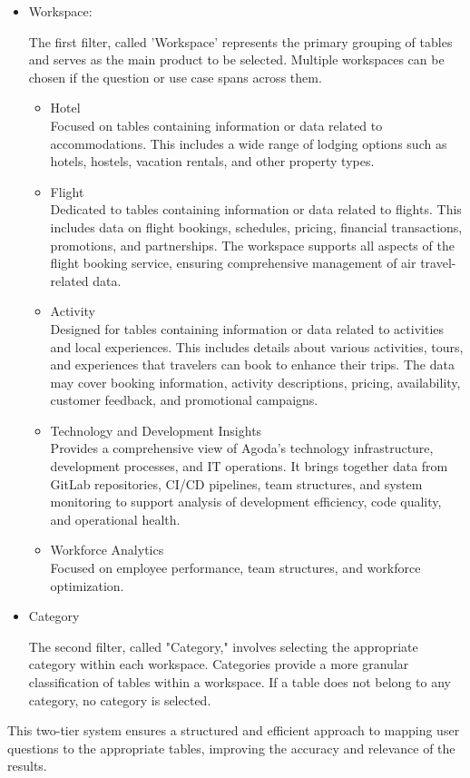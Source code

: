     \begin{itemize}
        \item Workspace:

        The first filter, called 'Workspace' represents the primary grouping of tables and serves as the main product to be selected. Multiple workspaces can be chosen if the question or use case spans across them.
            \begin{itemize}
                \item Hotel \\
                Focused on tables containing information or data related to accommodations. This includes a wide range of lodging options such as hotels, hostels, vacation rentals, and other property types.
                \item Flight \\
                Dedicated to tables containing information or data related to flights. This includes data on flight bookings, schedules, pricing, financial transactions, promotions, and partnerships. The workspace supports all aspects of the flight booking service, ensuring comprehensive management of air travel-related data.

                \item {Activity} \\
                Designed for tables containing information or data related to activities and local experiences. This includes details about various activities, tours, and experiences that travelers can book to enhance their trips. The data may cover booking information, activity descriptions, pricing, availability, customer feedback, and promotional campaigns.

                \item {Technology and Development Insights} \\
                Provides a comprehensive view of Agoda's technology infrastructure, development processes, and IT operations. It brings together data from GitLab repositories, CI/CD pipelines, team structures, and system monitoring to support analysis of development efficiency, code quality, and operational health.

                \item {Workforce Analytics} \\
                Focused on employee performance, team structures, and workforce optimization.
            \end{itemize}

        \item Category

        The second filter, called "Category," involves selecting the appropriate category within each workspace. Categories provide a more granular classification of tables within a workspace. If a table does not belong to any category, no category is selected.
    \end{itemize}
    This two-tier system ensures a structured and efficient approach to mapping user questions to the appropriate tables, improving the accuracy and relevance of the results.

